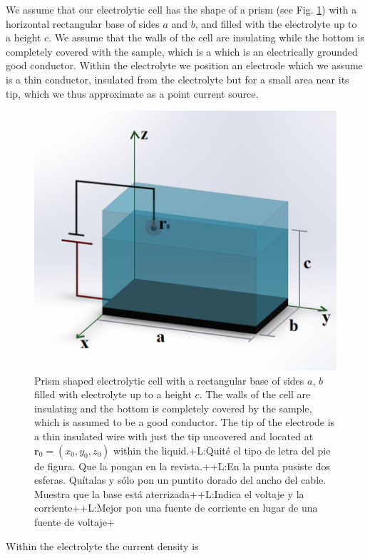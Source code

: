 \documentclass{article}
\newcommand{\notaL}[1]{{\color{blue}+L:#1+}}
\begin{document}
We assume that our electrolytic cell has the shape of a
prism (see Fig. \ref{f:celda}) with a horizontal rectangular base of sides $a$ and $b$, and
filled with the electrolyte up to a height $c$. We assume that the
walls of the cell are insulating while the bottom is completely
covered with the sample, which is a which is an
electrically grounded good conductor. Within the electrolyte we position an electrode
which we assume is a thin conductor, insulated from the electrolyte
but for a small area near its tip, which we thus approximate as a
point current source.
\begin{figure}
  \centering
  \includegraphics[scale=.4]{Images/celdan}
  \caption{Prism shaped electrolytic cell with a rectangular base of
    sides $a$, $b$ filled with electrolyte up to a height $c$. The
    walls of the cell are insulating and the bottom is completely
    covered by the sample, which is assumed to be a good
    conductor. The tip of the electrode is a thin insulated wire with
    just the tip uncovered and located at $\bm r_0=(x_0,y_0,z_0)$ within the
    liquid.\notaL{Quité el tipo de letra del pie de figura. Que la pongan en la
      revista.}\notaL{En la punta pusiste dos esferas. Quítalas y sólo
    pon un puntito dorado del ancho del cable. Muestra que la base
    está aterrizada}\notaL{Indica el voltaje y la
    corriente}\notaL{Mejor pon una fuente de corriente en lugar de una
  fuente de voltaje}}
  \label{f:celda}
\end{figure}
Within the electrolyte the current density is
\end{document}
